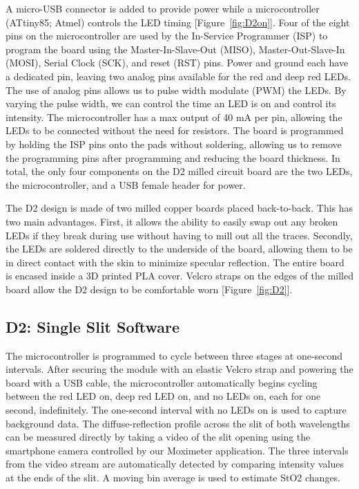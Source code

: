     A micro-USB connector is added to provide power while a microcontroller (ATtiny85; Atmel) controls the LED timing [Figure~\ref{fig:D2on}]. Four of the eight pins on the microcontroller are used by the In-Service Programmer (ISP) to program the board using the Master-In-Slave-Out (MISO), Master-Out-Slave-In (MOSI), Serial Clock (SCK), and reset (RST) pins. Power and ground each have a dedicated pin, leaving two analog pins available for the red and deep red LEDs. The use of analog pins allows us to pulse width modulate (PWM) the LEDs. By varying the pulse width, we can control the time an LED is on and control its intensity. The microcontroller has a max output of 40 mA per pin, allowing the LEDs to be connected without the need for resistors. The board is programmed by holding the ISP pins onto the pads without soldering, allowing us to remove the programming pins after programming and reducing the board thickness. In total, the only four components on the D2 milled circuit board are the two LEDs, the microcontroller, and a USB female header for power. 

    The D2 design is made of two milled copper boards placed back-to-back. This has two main advantages. First, it allows the ability to easily swap out any broken LEDs if they break during use without having to mill out all the traces. Secondly, the LEDs are soldered directly to the underside of the board, allowing them to be in direct contact with the skin to minimize specular reflection. The entire board is encased inside a 3D printed PLA cover. Velcro straps on the edges of the milled board allow the D2 design to be comfortable worn [Figure~\ref{fig:D2}]. 

    \subsection{D2: Single Slit Software}
    The microcontroller is programmed to cycle between three stages at one-second intervals. After securing the module with an elastic Velcro strap and powering the board with a USB cable, the microcontroller automatically begins cycling between the red LED on, deep red LED on, and no LEDs on, each for one second, indefinitely. The one-second interval with no LEDs on is used to capture background data. The diffuse-reflection profile across the slit of both wavelengths can be measured directly by taking a video of the slit opening using the smartphone camera controlled by our Moximeter application. The three intervals from the video stream are automatically detected by comparing intensity values at the ends of the slit. A moving bin average is used to estimate StO2 changes. 
    
